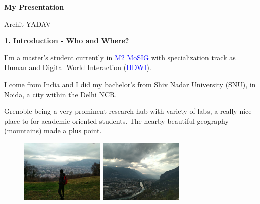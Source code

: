 \documentclass[mathserif,9pt]{beamer}
\begin{document}
\usebackgroundtemplate{}

\begin{frame}

\textcolor{b_bruz}{\bf{\Large{My Presentation}}}
\vspace*{1cm}

\small{
Archit YADAV
\vspace*{10mm}

}
\end{frame}
\begin{frame}
\small{

\textcolor{b_bruz}{\Large{\bf 1. Introduction - Who and Where?}}
\bigskip

I'm a master's student currently in \textcolor{blue}{M2 MoSIG} with specialization track as Human and Digital World Interaction (\textcolor{blue}{HDWI}).
\medskip

I come from India and I did my bachelor's from Shiv Nadar University (SNU), in Noida, a city within the Delhi NCR.
\bigskip

\textcolor{b_bruz}{}
\medskip

Grenoble being a very prominent research hub with variety of labs, a really nice place to for academic oriented students.
The nearby beautiful geography (mountains) made a plus point.

\begin{figure}[!tbp]
  \centering
  \begin{minipage}[b]{0.4\textwidth}
    \centering
    \includegraphics[height=3cm]{images/archit_hike_compressed.jpg}
  \end{minipage}
  \hfill
  \begin{minipage}[b]{0.4\textwidth}
    \centering
    \includegraphics[height=3cm]{images/grenoble_bastille_top.jpg}
  \end{minipage}
\end{figure}


}
\end{frame}
\end{document}
